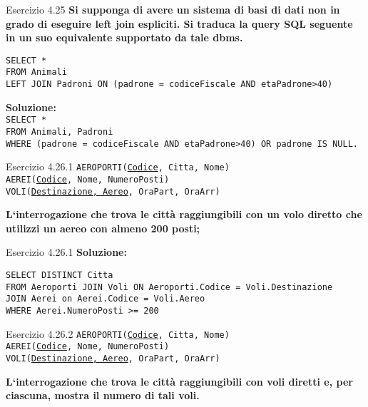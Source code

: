 \begin{frame}{Esercizio 4.25}
    \textbf{Si supponga di avere un sistema di basi di dati non in grado di
eseguire left join espliciti. Si traduca la query SQL seguente in un suo equivalente
supportato da tale dbms.}
    \vspace{1em}
    
    \texttt{SELECT *\\FROM Animali \\LEFT JOIN Padroni ON (padrone = codiceFiscale AND etaPadrone>40)}
    \vspace{1em}
    
    \textbf{Soluzione:}\\
    \texttt{SELECT *\\FROM Animali, Padroni\\WHERE (padrone = codiceFiscale AND etaPadrone>40)
OR padrone IS NULL.}
\end{frame}
\begin{frame}{Esercizio 4.26.1} 
    \texttt{AEROPORTI(\underline{Codice}, Citta, Nome)\\
    AEREI(\underline{Codice}, Nome, NumeroPosti)\\
    VOLI(\underline{Destinazione, Aereo}, OraPart, OraArr)}
    \vspace{1em}
    
    \textbf{L`interrogazione che trova le citt\`a raggiungibili con un volo diretto che utilizzi
un aereo con almeno 200 posti;}
\end{frame}

\begin{frame}{Esercizio 4.26.1}
    \textbf{Soluzione:}
    \vspace{1em}
    
    \texttt{SELECT DISTINCT Citta\\FROM Aeroporti JOIN Voli ON Aeroporti.Codice = Voli.Destinazione\\JOIN Aerei on Aerei.Codice = Voli.Aereo\\WHERE Aerei.NumeroPosti >= 200}
    \end{frame}
\begin{frame}{Esercizio 4.26.2} 
    \texttt{AEROPORTI(\underline{Codice}, Citta, Nome)\\
    AEREI(\underline{Codice}, Nome, NumeroPosti)\\
    VOLI(\underline{Destinazione, Aereo}, OraPart, OraArr)}
    \vspace{1em}
    
    \textbf{L`interrogazione che trova le citt\`a raggiungibili con voli diretti e, per ciascuna,
mostra il numero di tali voli.}
\end{frame}

